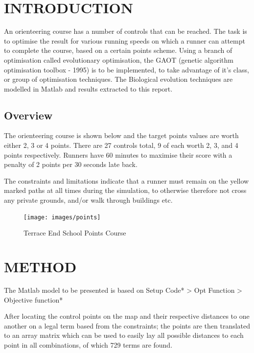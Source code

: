 \documentclass[a4paper, 10pt]{IEEEconf}
\begin{document}
\section{INTRODUCTION}

An orienteering course has a number of controls that can be reached. The task is to optimise the result for various running speeds on which a runner can attempt to complete the course, based on a certain points scheme. Using a branch of optimisation called evolutionary optimisation, the GAOT (genetic algorithm optimisation toolbox - 1995) is to be implemented, to take advantage of it's class, or group of optimisation techniques. The Biological evolution techniques are modelled in Matlab and results extracted to this report.


\subsection{Overview}
The orienteering course is shown below and the target points values are worth either 2, 3 or 4 points. There are 27 controls total, 9 of each worth 2, 3, and 4 points respectively. Runners have 60 minutes to maximise their score with a penalty of 2 points per 30 seconds late back. 

The constraints and limitations indicate that a runner must remain on the yellow marked paths at all times during the simulation, to otherwise therefore not cross any private grounds, and/or walk through buildings etc. 

\begin{figure}[H]
  \texttt{[image: images/points]}
  \caption{Terrace End School Points Course}
  \label{fig:Terrace End School Points Course}
\end{figure}

\clearpage
\section{METHOD}

The Matlab model to be presented is based on Setup Code* > Opt Function > Objective function* 

After locating the control points on the map and their respective distances to one another on a legal term based from the constraints; the points are then translated to an array matrix which can be used to easily lay all possible distances to each point in all combinations, of which 729 terms are found.
\end{document}
